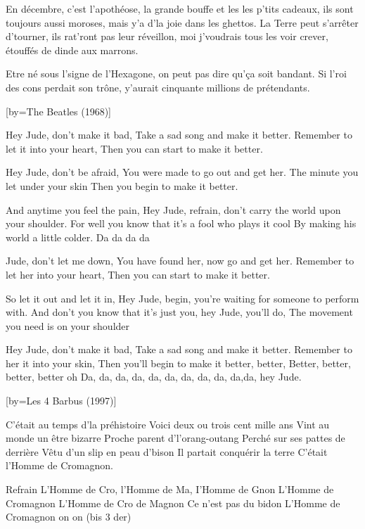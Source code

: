 \beginverse
En décembre, c'est l'apothéose,
la grande bouffe et les les p'tits cadeaux,
ils sont toujours aussi moroses,
mais y'a d'la joie dans les ghettos.
La Terre peut s'arrêter d'tourner,
ils rat'ront pas leur réveillon,
moi j'voudrais tous les voir crever,
étouffés de dinde aux marrons.
\endverse

\beginverse
Etre né sous l'signe de l'Hexagone,
on peut pas dire qu'ça soit bandant.
Si l'roi des cons perdait son trône,
y'aurait cinquante millions de prétendants.
\endverse

[by={The Beatles (1968)}]

\beginverse
Hey Jude, don't make it bad,
Take a sad song and make it better.
Remember to let it into your heart,
Then you can start to make it better.
\endverse

\beginverse
Hey Jude, don't be afraid,
You were made to go out and get her.
The minute you let under your skin
Then you begin to make it better.
\endverse

\beginverse
And anytime you feel the pain,
Hey Jude, refrain, don't carry the world upon your shoulder.
For well you know that it's a fool who plays it cool
By making his world a little colder.
Da da da da
\endverse

\beginverse
Jude, don't let me down,
You have found her, now go and get her.
Remember to let her into your heart,
Then you can start to make it better.
\endverse

\beginverse
So let it out and let it in,
Hey Jude, begin, you're waiting for someone to perform with.
And don't you know that it's just you, hey Jude, you'll do,
The movement you need is on your shoulder
\endverse

\beginverse
Hey Jude, don't make it bad,
Take a sad song and make it better.
Remember to her it into your skin,
Then you'll begin to make it better, better,
Better, better, better, better oh
Da, da, da, da, da, da, da, da, da, da,da, hey Jude.
\endverse

[by={Les 4 Barbus (1997)}]

\beginverse
C'était au temps d'la préhistoire
Voici deux ou trois cent mille ans
Vint au monde un être bizarre
Proche parent d'l'orang-outang
Perché sur ses pattes de derrière
Vêtu d'un slip en peau d'bison
Il partait conquérir la terre
C'était l'Homme de Cromagnon.
\endverse

\beginverse
Refrain
L'Homme de Cro, l'Homme de Ma, I'Homme de Gnon
L'Homme de Cromagnon
L'Homme de Cro de Magnon
Ce n'est pas du bidon
L'Homme de Cromagnon on on
(bis 3 der)
\endverse

